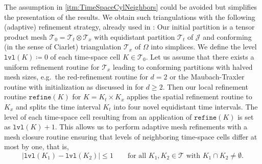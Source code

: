 \documentclass{amsart}
\providecommand{\tria}{\mathcal{T}}
\providecommand{\level}{\mathtt{lvl}}
\providecommand{\refine}{\mathtt{refine}}
\begin{document}
The assumption in \ref{itm:TimeSpaceCylNeighbors} could be avoided but simplifies the presentation of the results.
We obtain such triangulations with the following (adaptive) refinement strategy, already used in \cite{GantnerStevenson23}:
Our initial partition is a tensor product mesh 
$\tria_0 = \tria_t \otimes \tria_x$ with equidistant partition $\tria_t$ of $\mathcal{J}$ and conforming (in the sense of Ciarlet) triangulation $\tria_x$ of $\Omega$ into simplices. We define the level $\level(K) \coloneqq 0$ of each time-space cell $K\in \tria_0$. Let us assume that there exists a uniform refinement routine for $\tria_x$ leading to conforming partitions with halved mesh sizes, e.g.~the red-refinement routine for $d=2$ or the Maubach-Traxler routine with initialization as discussed in \cite{DieningGehringStorn23} for $d\geq 2$.
Then our local refinement routine $\refine(K)$ for $K = K_t \times K_x$ applies the spatial refinement routine to $K_x$ and splits the time interval $K_t$ into four novel equidistant time intervals. The level of each time-space cell resulting from an application of $\refine(K)$ is set as $\level(K)+1$. This allows us to perform adaptive mesh refinements with a mesh closure routine ensuring that levels of neighboring time-space cells differ at most by one, that is,
\begin{equation}\label{eq:LevelDist}
|\level(K_1) - \level(K_2)|\leq 1\qquad\text{for all }K_1,K_2\in \tria\text{ with }K_1\cap K_2 \neq \emptyset.
\end{equation}
\end{document}
